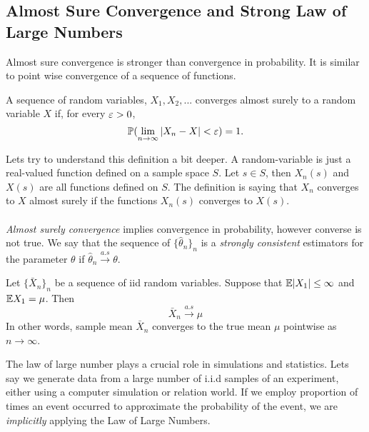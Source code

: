 \subsection{Almost Sure Convergence and Strong Law of Large Numbers}
Almost sure convergence is stronger than convergence in probability. It is similar to point wise convergence of a sequence of functions.
\begin{definition}
    A sequence of random variables, $X_1,X_2,...$ converges almost surely to a random variable $X$ if, for every $\varepsilon > 0$,
    $$
    \mathbb P(\lim_{n \to \infty}|X_n - X|< \varepsilon ) = 1.
    $$
\end{definition}
Lets try to understand this definition a bit deeper. A random-variable is just a real-valued function defined on a sample space $S$. Let $s \in S$, then $X_{n}(s)$ and $X(s)$ are all functions defined on $S$. The definition is saying that $X_n$ converges to $X$ almost surely if the functions $X_{n}(s)$ converges to $X(s)$.\\
\\
 \textit{Almost surely convergence} implies convergence in probability, however converse is not true. We say that the sequence of $\{ \hat{\theta}_n \}_n$ is a \textit{strongly consistent} estimators for the parameter $\theta$ if $\hat{\theta}_n \xrightarrow{a.s} \theta$.
\begin{theorem}
    Let $\{ \bar{X}_n \}_n$ be a sequence of iid random variables. Suppose that $\mathbb E|X_1| \leq \infty$ and $\mathbb E X_1 = \mu$. Then 
    $$
    \bar{X}_n \xrightarrow{a.s} \mu 
    $$
    In other words, sample mean $\bar{X}_n$ converges to the true mean $\mu$ pointwise as $n \to \infty$.
\end{theorem}
The law of large number plays a crucial role in simulations and statistics. Lets say we generate data from a large number of i.i.d samples of an experiment, either using a computer simulation or relation world. If we employ proportion of times an event occurred to approximate the probability of the event, we are \textit{implicitly} applying the Law of Large Numbers.
